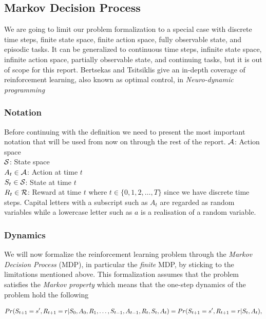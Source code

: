 \documentclass[result.tex]{subfiles}
\begin{document}
    \subsection*{Markov Decision Process}

    We are going to limit our problem formalization to a special case with discrete time steps, finite state space, finite action space, fully observable state, and episodic tasks. It can be generalized to continuous time steps, infinite state space, infinite action space, partially observable state, and continuing tasks, but it is out of scope for this report. Bertsekas and Tsitsiklis give an in-depth coverage of reinforcement learning, also known as optimal control, in \textit{Neuro-dynamic programming} \cite{bertsekas1995neuro}

    \subsubsection*{Notation}

    Before continuing with the definition we need to present the most important notation that will be used from now on through the rest of the report.
    \newline
    $\mathcal{A}$: Action space \\
    $\mathcal{S}$: State space \\
    $A_t \in \mathcal{A}$: Action at time $t$ \\
    $S_t \in \mathcal{S}$: State at time $t$ \\
    $R_t \in \mathcal{R}$: Reward at time $t$
    \newline
    where $t \in \{ 0, 1, 2, \ldots, T \}$ since we have discrete time steps. Capital letters with a subscript such as $A_t$ are regarded as random variables while a lowercase letter such as $a$ is a realisation of a random variable.

    \subsubsection*{Dynamics}

    We will now formalize the reinforcement learning problem through the \textit{Markov Decision Process} (MDP), in particular the \textit{finite} MDP, by sticking to the limitations mentioned above. This formalization assumes that the problem satisfies the \textit{Markov property} which means that the one-step dynamics of the problem hold the following

    \begin{align*}
        Pr(S_{t + 1} = s^\prime, R_{t + 1} = r | S_0, A_0, R_1, \ldots, S_{t - 1}, A_{t - 1}, R_t, S_t, A_t) = Pr(S_{t + 1} = s^\prime, R_{t + 1} = r | S_t, A_t),
    \end{align*}
\end{document}
